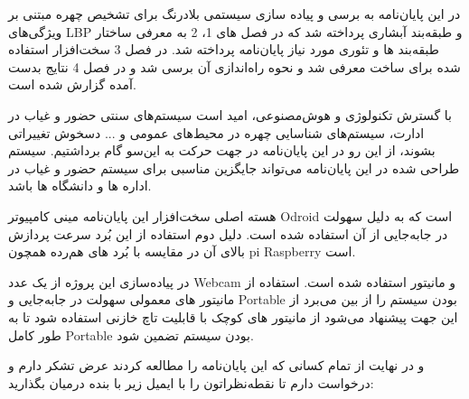 

در این پایان‌نامه به برسی و پیاده سازی سیستمی بلادرنگ برای تشخیص چهره مبتنی بر ویژگی‌های LBP و طبقه‌بند آبشاری پرداخته شد که در فصل های 1، 2 به معرفی ساختار طبقه‌بند ها و تئوری مورد نیاز پایان‌نامه پرداخته شد. در فصل 3 سخت‌افزار استفاده شده برای ساخت معرفی شد و نحوه راه‌اندازی آن برسی شد و در فصل 4 نتایج بدست آمده گزارش شده است.

با گسترش تکنولوژی و هوش‌مصنوعی، امید است سیستم‌های سنتی حضور و غیاب در ادارت، سیستم‌های شناسایی چهره در محیط‌های عمومی و ... دسخوش تغییراتی بشوند، از این رو در این پایان‌نامه در جهت حرکت به این‌سو گام برداشتیم. سیستم طراحی شده در این پایان‌نامه می‌تواند جایگزین مناسبی برای سیستم حضور و غیاب در اداره ها و دانشگاه ها باشد.

هسته اصلی سخت‌افزار این پایان‌نامه مینی کامپیوتر Odroid است که به دلیل سهولت در جا‌به‌جایی از آن استفاده شده است. دلیل دوم استفاده از این بُرد سرعت پردازش بالای آن در مقایسه با بُرد های هم‌رده همچون pi Raspberry است.

در پیاده‌سازی این پروژه از یک عدد Webcam و مانیتور استفاده شده است. استفاده از مانیتور های معمولی سهولت در جا‌به‌جایی و Portable بودن سیستم را از بین می‌برد از این جهت پیشنهاد می‌شود از مانیتور های کوچک با قابلیت تاچ خازنی استفاده شود تا به طور کامل Portable بودن سیستم تضمین شود.

و در نهایت از تمام کسانی که این پایان‌نامه را مطالعه کردند عرض تشکر دارم و درخواست دارم تا نقطه‌نظراتون را با ایمیل زیر با بنده در‌میان بگذارید: \\
\begin{latin}
	\href{mailto:reza_adinepour@shahroodut.ac.ir}{}
\end{latin}

